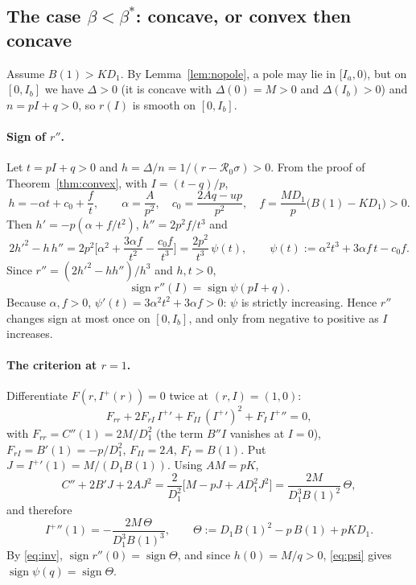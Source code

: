 \documentclass[11pt]{article}
\theoremstyle{remark}
\newcommand{\R}{\mathcal R_0}
\begin{document}
\subsection{The case $\beta<\beta^*$: concave, or convex then concave}

Assume $B(1)>KD_1$. By Lemma~\ref{lem:nopole}, a pole may lie in $[I_a,0)$, but on $[0,I_b]$ we have $\Delta>0$ (it is concave with $\Delta(0)=M>0$ and $\Delta(I_b)>0$) and $n=pI+q>0$, so $r(I)$ is smooth on $[0,I_b]$.

\paragraph{Sign of $r''$.} Let $t=pI+q>0$ and $h=\Delta/n=1/(r-\R\sigma)>0$. From the proof of Theorem~\ref{thm:convex}, with $I=(t-q)/p$,
\[
h=-\alpha t+c_0+\frac ft,\qquad \alpha=\frac A{p^2},\quad c_0=\frac{2Aq-up}{p^2},\quad f=\frac{MD_1}{p}\big(B(1)-KD_1\big)>0 .
\]
Then $h'=-p(\alpha+f/t^2)$, $h''=2p^2f/t^3$ and
\[
2h'^2-h\,h''=2p^2\Big[\alpha^2+\frac{3\alpha f}{t^2}-\frac{c_0f}{t^3}\Big]=\frac{2p^2}{t^3}\,\psi(t),\qquad
\psi(t):=\alpha^2t^3+3\alpha f\,t-c_0f .
\]
Since $r''=(2h'^2-hh'')/h^3$ and $h,t>0$,
\begin{equation}
\operatorname{sign}r''(I)=\operatorname{sign}\psi(pI+q).
\label{eq:psi}
\end{equation}
Because $\alpha,f>0$, $\psi'(t)=3\alpha^2t^2+3\alpha f>0$: $\psi$ is strictly increasing. Hence $r''$ changes sign at most once on $[0,I_b]$, and only from negative to positive as $I$ increases.

\paragraph{The criterion at $r=1$.} Differentiate $F(r,I^+(r))=0$ twice at $(r,I)=(1,0)$:
\[
F_{rr}+2F_{rI}\,{I^+}'+F_{II}\,({I^+}')^2+F_I\,{I^+}''=0 ,
\]
with $F_{rr}=C''(1)=2M/D_1^2$ (the term $B''I$ vanishes at $I=0$), $F_{rI}=B'(1)=-p/D_1^2$, $F_{II}=2A$, $F_I=B(1)$. Put $J={I^+}'(1)=M/(D_1B(1))$. Using $AM=pK$,
\[
C''+2B'J+2AJ^2=\frac2{D_1^2}\Big[M-pJ+AD_1^2J^2\Big]=\frac{2M}{D_1^3B(1)^2}\,\Theta ,
\]
and therefore
\begin{equation}
{I^+}''(1)=-\frac{2M\,\Theta}{D_1^{3}B(1)^{3}},\qquad
\Theta:=D_1B(1)^2-p\,B(1)+pKD_1 .
\label{eq:I2at1}
\end{equation}
By \eqref{eq:inv}, $\operatorname{sign}r''(0)=\operatorname{sign}\Theta$, and since $h(0)=M/q>0$, \eqref{eq:psi} gives $\operatorname{sign}\psi(q)=\operatorname{sign}\Theta$.
\end{document}
